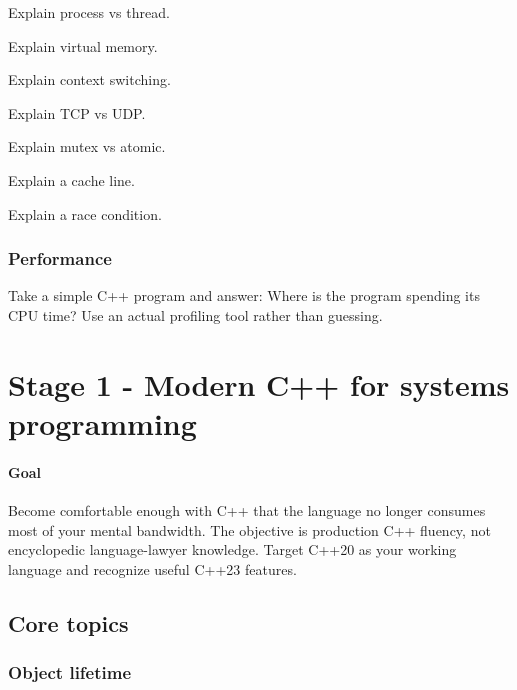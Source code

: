 \documentclass[11pt,letterpaper]{article}
\begin{document}
\begin{topics}

\item Explain process vs thread.

\item Explain virtual memory.

\item Explain context switching.

\item Explain TCP vs UDP.

\item Explain mutex vs atomic.

\item Explain a cache line.

\item Explain a race condition.

\end{topics}

\subsubsection*{Performance}

Take a simple C++ program and answer: Where is the program spending its CPU time? Use an actual profiling tool rather than guessing.

\section{Stage 1 - Modern C++ for systems programming}\label{sec:5}

\label{stage:1}

\paragraph*{Goal}

Become comfortable enough with C++ that the language no longer consumes most of your mental bandwidth. The objective is production C++ fluency, not encyclopedic language-lawyer knowledge. Target C++20 as your working language and recognize useful C++23 features.

\subsection*{Core topics}

\subsubsection*{Object lifetime}
\end{document}

